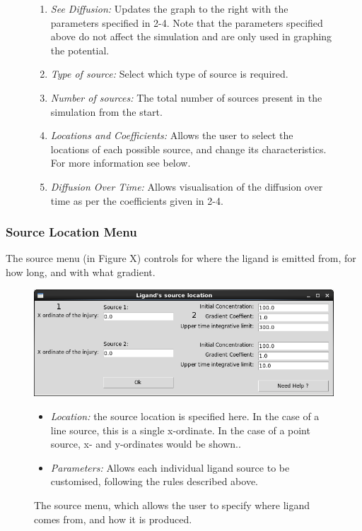 \documentclass[12pt]{article}
\begin{document}
\begin{figure}[H]
{\begin{enumerate}[topsep=2pt,itemsep=-1ex,partopsep=1ex,parsep=1ex]
  \item {\itshape See Diffusion:} Updates the graph to the right with the 
  parameters specified in 2-4. Note that the parameters specified above do 
  not affect the simulation and are only used in graphing the potential.
  \item {\itshape Type of source:} Select which type of source is 
  required.
  \item {\itshape Number of sources: }The total number of sources present 
  in the simulation from the start.
  \item {\itshape Locations and Coefficients: }Allows the user to select 
  the locations of each possible source, and change its characteristics. 
  For more information see below.
  \item {\itshape Diffusion Over Time:} Allows visualisation of the 
  diffusion over time as per the coefficients given in 2-4.
\end{enumerate}
}
\end{figure}

\subsubsection{Source Location Menu}
The source menu (in Figure X) controls for where the ligand is emitted 
from, for how long, and with what gradient.

\begin{figure}[H]
\centering
\includegraphics[width=13.51cm]{media/source_loc_screen_annotated.png}
\caption[]{The source menu, which allows the user to specify 
where ligand comes from, and how it is produced.}
\begin{itemize}
\item {\itshape Location: }the source location is specified here. In the 
case of a line source, this is a single x-ordinate. In the case of a 
point source, x- and y-ordinates would be shown..
\item {\itshape Parameters: }Allows each individual ligand source to be 
customised, following the rules described above.
\end{itemize}
\end{figure}
\end{document}
